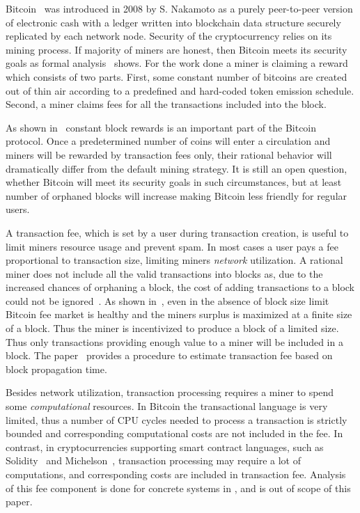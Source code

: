 \documentclass[]{llncs}   %
\begin{document}
Bitcoin~\cite{Nakamoto2008} was introduced in 2008 by S. Nakamoto as a purely
peer-to-peer version of electronic cash with a ledger written into blockchain
data structure securely replicated by each network node. Security of the cryptocurrency 
relies on its mining process. If majority of miners are honest, then Bitcoin
meets its security goals as formal analysis~\cite{Garay2015} shows. For the work
done a miner is claiming a reward which consists of two parts. First, some
constant number of bitcoins are created out of thin air according to a
predefined and hard-coded token emission schedule. Second, a miner claims fees
for all the transactions included into the block.

As shown in~\cite{carlsten2016instability} constant block rewards is an important
part of the Bitcoin protocol. Once a predetermined number of coins will enter a circulation
and miners will be rewarded by transaction fees only, their rational behavior will
dramatically differ from the default mining strategy. It is still an open question, whether
Bitcoin will meet its security goals in such circumstances, but at least number of
orphaned blocks will increase making Bitcoin less friendly for regular users.

A transaction fee, which is set by a user during transaction creation, is
useful to limit miners resource usage and prevent spam. In most cases a user pays a fee proportional to transaction size,
limiting miners {\em network} utilization. A rational miner does not
include all the valid transactions into blocks as, due to the increased
chances of orphaning a block, the cost of adding transactions to a block
could not be ignored~\cite{andersen2013,rizun2015transaction}. As shown
in~\cite{rizun2015transaction}, even in the absence of block size limit
Bitcoin fee market is healthy and the miners surplus is maximized at a
finite size of a block. Thus the miner is incentivized to produce
a block of a limited size. Thus only transactions providing enough value to a miner will be included in a block. The 
paper~\cite{rizun2015transaction} provides a procedure to estimate
transaction fee based on block propagation time.

Besides network utilization, transaction processing requires a miner
to spend some {\em computational} resources.
In Bitcoin the transactional language\cite{script} is very limited, thus
a number of CPU cycles needed to process a transaction
is strictly bounded and corresponding computational costs are not included in the fee.
In contrast, in cryptocurrencies supporting smart contract
languages, such as Solidity~\cite{solidity} and Michelson~\cite{tezosScript},
transaction processing may require a lot of computations, and
corresponding costs are included in transaction fee. Analysis of this fee component is done for concrete systems
in \cite{Earlz2017,luu2015demystifying}, and is out of scope of this paper.
\end{document}
